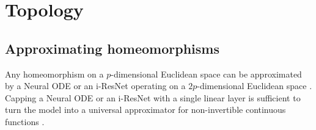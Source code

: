 \documentclass{article}
\theoremstyle{definition} \newtheorem{definition}{Definition}  \newtheorem{example}{Example}
\theoremstyle{remark} \newtheorem{remark}{Remark}
\newcounter{ct}
\begin{document}



%
%
%
%


\newpage






\newpage
\appendix


\section{Topology}\label{sec:topology}

\subsection{Approximating homeomorphisms}\label{sec:homeomorphisms}
Any homeomorphism on a $p$-dimensional Euclidean space can be approximated by a Neural ODE or an i-ResNet operating on a $2p$-dimensional Euclidean space \citep{zhang2020approximation}.
%
Capping a Neural ODE or an i-ResNet with a single linear layer is sufficient to turn the model into a universal approximator for non-invertible continuous functions \citep{zhang2020approximation}.
\end{document}
